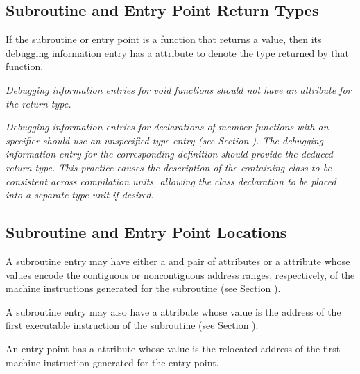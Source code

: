\subsection{Subroutine and Entry Point Return Types}
\label{chap:subroutineandentrypointreturntypes}

If 
\hypertarget{chap:DWATtypetypeofsubroutinereturn}{}
the subroutine or entry point 
is a function that returns a
value, then its debugging information entry has 
a \DWATtype{} attribute 
to denote the type returned by that function.

\textit{Debugging information entries for 
 void functions should
not have an attribute for the return type.  }

\textit{Debugging information entries for declarations of  
member functions with an 
 specifier should use an unspecified 
type entry (see 
Section ). 
The debugging information entry for the corresponding definition
should provide the deduced return type.  This practice causes the description of
the containing class to be consistent across compilation units, allowing the class
declaration to be placed into a separate type unit if desired.}


\subsection{Subroutine and Entry Point Locations}
\label{chap:subroutineandentrypointlocations}

A subroutine entry may have either a \DWATlowpc{} and
\DWAThighpc{} pair of attributes or a \DWATranges{} attribute
whose 
values 
encode the contiguous or non\dash contiguous address
ranges, respectively, of the machine instructions generated
for the subroutine (see 
Section ).

A 
\hypertarget{chap:DWATentrypcentryaddressofsubprogram}{}
subroutine entry may also have 
a 
\DWATentrypc{} attribute
whose value is the address of the first executable instruction
of the subroutine (see 
Section ).

An entry point has a \DWATlowpc{} attribute whose value is the
relocated address of the first machine instruction generated
for the entry point.

